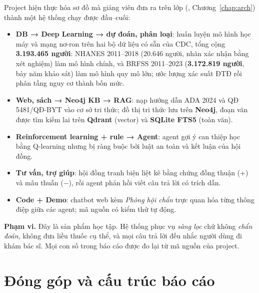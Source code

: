 Project hiện thực hóa sơ đồ mà giảng viên đưa ra trên lớp (, Chương~\ref{chap:arch}) thành một hệ thống chạy được đầu–cuối:
\begin{itemize}
  \item \textbf{DB → Deep Learning → dự đoán, phân loại}: huấn luyện mô hình học máy và mạng nơ-ron trên hai bộ dữ liệu có sẵn của CDC, tổng cộng \textbf{3.193.465 người}: NHANES 2011–2018 (20.646 người, nhãn xác nhận bằng xét nghiệm) làm mô hình chính, và BRFSS 2011–2023 (\textbf{3.172.819 người}, bảy năm khảo sát) làm mô hình quy mô lớn; ước lượng xác suất ĐTĐ rồi phân tầng nguy cơ thành bốn mức.
  \item \textbf{Web, sách → Neo4j KB → RAG}: nạp hướng dẫn ADA 2024 và QĐ 5481/QĐ-BYT vào cơ sở tri thức; đồ thị tri thức lưu trên \textbf{Neo4j}, đoạn văn được tìm kiếm lai trên \textbf{Qdrant} (vector) và \textbf{SQLite FTS5} (toàn văn).
  \item \textbf{Reinforcement learning + rule → Agent}: agent gợi ý can thiệp học bằng Q-learning nhưng bị ràng buộc bởi luật an toàn và kết luận của hội đồng.
  \item \textbf{Tư vấn, trợ giúp}: hội đồng tranh biện liệt kê bằng chứng đồng thuận (+) và mâu thuẫn (−), rồi agent phản hồi viết câu trả lời có trích dẫn.
  \item \textbf{Code + Demo}: chatbot web kèm \emph{Phòng hội chẩn} trực quan hóa từng thông điệp giữa các agent; mã nguồn có kiểm thử tự động.
\end{itemize}

\textbf{Phạm vi.} Đây là sản phẩm học tập. Hệ thống phục vụ \emph{sàng lọc} chứ không \emph{chẩn đoán}, không đưa liều thuốc cụ thể, và mọi câu trả lời đều nhắc người dùng đi khám bác sĩ. Mọi con số trong báo cáo được đo lại từ mã nguồn của project.

\section{Đóng góp và cấu trúc báo cáo}

